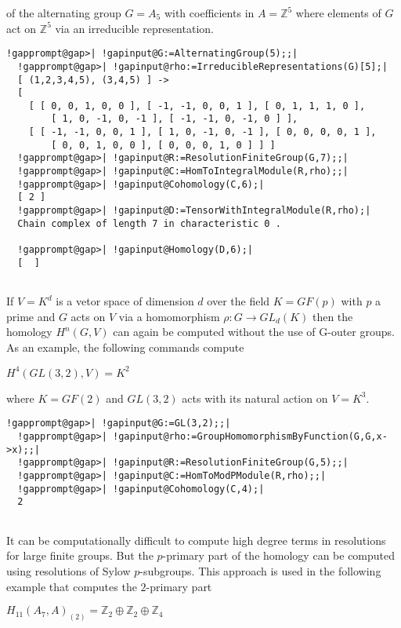 \documentclass[a4paper,11pt]{report}
\begin{document}
{{ of the alternating group $G=A_5$ with coefficients in $A=\mathbb Z^5$ where elements of $G$ act on $\mathbb Z^5$ via an irreducible representation. 
\begin{Verbatim}[commandchars=!@|,fontsize=\small,frame=single,label=Example]
  !gapprompt@gap>| !gapinput@G:=AlternatingGroup(5);;|
  !gapprompt@gap>| !gapinput@rho:=IrreducibleRepresentations(G)[5];|
  [ (1,2,3,4,5), (3,4,5) ] -> 
  [ 
    [ [ 0, 0, 1, 0, 0 ], [ -1, -1, 0, 0, 1 ], [ 0, 1, 1, 1, 0 ], 
        [ 1, 0, -1, 0, -1 ], [ -1, -1, 0, -1, 0 ] ], 
    [ [ -1, -1, 0, 0, 1 ], [ 1, 0, -1, 0, -1 ], [ 0, 0, 0, 0, 1 ], 
        [ 0, 0, 1, 0, 0 ], [ 0, 0, 0, 1, 0 ] ] ]
  !gapprompt@gap>| !gapinput@R:=ResolutionFiniteGroup(G,7);;|
  !gapprompt@gap>| !gapinput@C:=HomToIntegralModule(R,rho);;|
  !gapprompt@gap>| !gapinput@Cohomology(C,6);|
  [ 2 ]
  !gapprompt@gap>| !gapinput@D:=TensorWithIntegralModule(R,rho);|
  Chain complex of length 7 in characteristic 0 . 
  
  !gapprompt@gap>| !gapinput@Homology(D,6);|
  [  ]
  
\end{Verbatim}
 

If $V=K^d$ is a vetor space of dimension $d$ over the field $K=GF(p)$ with $p$ a prime and $G$ acts on $V$ via a homomorphism $\rho\colon G\rightarrow GL_d(K)$ then the homology $H^n(G,V)$ can again be computed without the use of G-outer groups. As an example, the
following commands compute 

$H^4(GL(3,2),V) =K^2$ 

where $K=GF(2)$ and $GL(3,2)$ acts with its natural action on $V=K^3$. 
\begin{Verbatim}[commandchars=!@|,fontsize=\small,frame=single,label=Example]
  !gapprompt@gap>| !gapinput@G:=GL(3,2);;|
  !gapprompt@gap>| !gapinput@rho:=GroupHomomorphismByFunction(G,G,x->x);;|
  !gapprompt@gap>| !gapinput@R:=ResolutionFiniteGroup(G,5);;|
  !gapprompt@gap>| !gapinput@C:=HomToModPModule(R,rho);;|
  !gapprompt@gap>| !gapinput@Cohomology(C,4);|
  2
  
\end{Verbatim}
 

 It can be computationally difficult to compute high degree terms in
resolutions for large finite groups. But the $p$-primary part of the homology can be computed using resolutions of Sylow $p$-subgroups. This approach is used in the following example that computes the $2$-primary part 

$H_{11}(A_7,A)_{(2)} = \mathbb Z_2 \oplus \mathbb Z_2\oplus \mathbb Z_4$ 

}}
\end{document}
